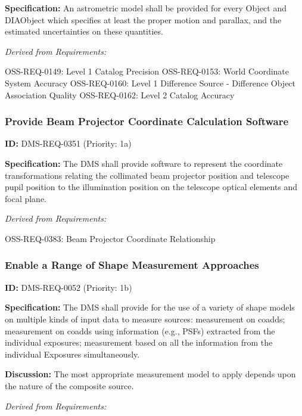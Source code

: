 \documentclass[SE,toc,lsstdraft]{lsstdoc}
\begin{document}
\textbf{Specification:} An astrometric model shall be provided for every Object and DIAObject which specifies at least the proper motion and parallax, and the estimated uncertainties on these quantities.

\emph{Derived from Requirements:}

OSS-REQ-0149:
Level 1 Catalog Precision \newline
OSS-REQ-0153:
World Coordinate System Accuracy \newline
OSS-REQ-0160:
Level 1 Difference Source - Difference Object Association Quality \newline
OSS-REQ-0162:
Level 2 Catalog Accuracy \newline

\subsubsection{Provide Beam Projector Coordinate Calculation Software}

\label{DMS-REQ-0351}
\textbf{ID:} DMS-REQ-0351 (Priority: 1a)

\textbf{Specification:}  The DMS shall provide software to represent the coordinate transformations relating the collimated beam projector position and telescope pupil position to the illumination position on the telescope optical elements and focal plane.

\emph{Derived from Requirements:}

OSS-REQ-0383:
Beam Projector Coordinate Relationship \newline

\subsubsection{Enable a Range of Shape Measurement Approaches}

\label{DMS-REQ-0052}
\textbf{ID:} DMS-REQ-0052 (Priority: 1b)

\textbf{Specification:} The DMS shall provide for the use of a variety of shape models on multiple kinds of input data to measure sources: measurement on coadds; measurement on coadds using information (e.g., PSFs) extracted from the individual exposures; measurement based on all the information from the individual Exposures simultaneously.

\textbf{Discussion: }The most appropriate measurement model to apply depends upon the nature of the composite source.

\emph{Derived from Requirements:}
\end{document}
